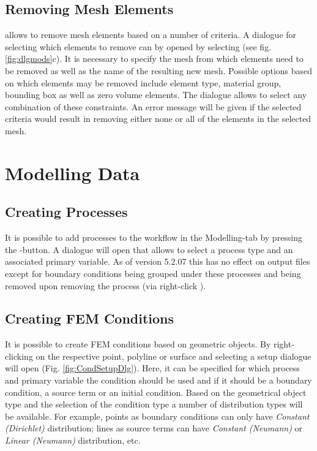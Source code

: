 \subsection{Removing Mesh Elements}

\ogs allows to remove mesh elements based on a number of criteria. A dialogue for selecting which elements to remove can by opened by selecting  (see fig. \ref{fig:dlgmods}c). It is necessary to specify the mesh from which elements need to be removed as well as the name of the resulting new mesh. Possible options based on which elements may be removed include element type, material group, bounding box as well as zero volume elements. The dialogue allows to select any combination of these constraints. An error message will be given if the selected criteria would result in removing either none or all of the elements in the selected mesh.



\section{Modelling Data}

\subsection{Creating Processes}

It is possible to add processes to the workflow in the Modelling-tab by pressing the -button. A dialogue will open that allows to select a process type and an associated primary variable. As of version 5.2.07 this has no effect on output files except for boundary conditions being grouped under these processes and being removed upon removing the process (via right-click ).

\subsection{Creating FEM Conditions}

It is possible to create FEM conditions based on geometric objects. By right-clicking on the respective point, polyline or surface and selecting  a setup dialogue will open (Fig. \ref{fig:CondSetupDlg}). Here, it can be specified for which process and primary variable the condition should be used and if it should be a boundary condition, a source term or an initial condition. Based on the geometrical object type and the selection of the condition type a number of distribution types will be available. For example, points as boundary conditions can only have \emph{Constant (Dirichlet)} distribution; lines as source terms can have \emph{Constant (Neumann)} or \emph{Linear (Neumann)} distribution, etc.

